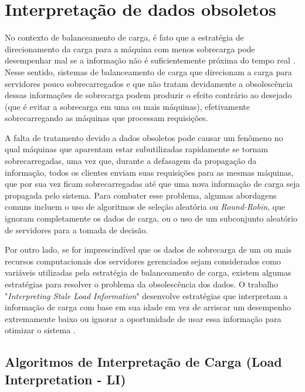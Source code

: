 \section{Interpretação de dados obsoletos}

No contexto de balanceamento de carga, é fato que a estratégia de direcionamento da carga para a máquina com menos sobrecarga pode desempenhar mal se a informação não é suficientemente próxima do tempo real \cite{adaptiveLoadSharing1986, analysisDelaysLoadSharing1989, howUsefulIsLoadInformation2000, loadDistributingInLocallyDistributedSystems1993}. Nesse sentido, sistemas de balanceamento de carga que direcionam a carga para servidores pouco sobrecarregados e que não tratam devidamente a obsolescência dessas informações de sobrecarga podem produzir o efeito contrário ao desejado (que é evitar a sobrecarga em uma ou mais máquinas), efetivamente sobrecarregando as máquinas que processam requisições.

A falta de tratamento devido a dados obsoletos pode causar um fenômeno no qual máquinas que aparentam estar subutilizadas rapidamente se tornam sobrecarregadas, uma vez que, durante a defasagem da propagação da informação, todos os clientes enviam suas requisições para as mesmas máquinas, que por sua vez ficam sobrecarregadas até que uma nova informação de carga seja propagada pelo sistema. Para combater esse problema, algumas abordagens comuns incluem o uso de algoritmos de seleção aleatória ou \textit{Round-Robin}, que ignoram completamente os dados de carga, ou o uso de um subconjunto aleatório de servidores para a tomada de decisão.

Por outro lado, se for imprescindível que os dados de sobrecarga de um ou mais recursos computacionais dos servidores gerenciados sejam considerados como variáveis utilizadas pela estratégia de balanceamento de carga, existem algumas estratégias para resolver o problema da obsolescência dos dados. O trabalho "\textit{Interpreting Stale Load Information}" desenvolve estratégias que interpretam a informação de carga com base em sua idade em vez de arriscar um desempenho extremamente baixo ou ignorar a oportunidade de usar essa informação para otimizar o sistema \cite{interpretingStaleLoadInformation2000}.

\subsection{Algoritmos de Interpretação de Carga (Load Interpretation - LI)}

